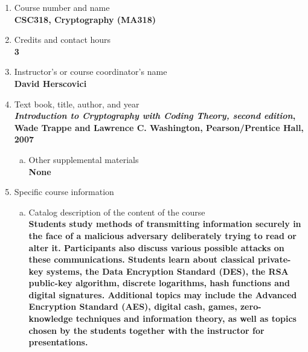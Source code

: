 \label{CSC318}  %
\begin{enumerate}[1.]
\item Course number and name\\
  {\bfseries
    CSC318, Cryptography (MA318)
  }
  
\item Credits and contact hours\\
  {\bfseries
    3  %
  }

\item Instructor's or course coordinator's name\\
  {\bfseries
    David Herscovici    
  }

\item Text book, title, author, and year\\
  {\bfseries
{\em Introduction to Cryptography with Coding Theory, second edition}, Wade Trappe and Lawrence C. Washington, Pearson/Prentice Hall, 2007    
  }
\begin{enumerate}[a.]
\item Other supplemental materials\\
  {\bfseries
    None    
  }
\end{enumerate}

\item Specific course information
\begin{enumerate}[a.]  
\item Catalog description of the content of the course\\
  {\bfseries
Students study methods of transmitting information securely in the face of a malicious adversary deliberately trying to read or alter it. Participants also discuss various possible attacks on these communications. Students learn about classical private-key systems, the Data Encryption Standard (DES), the RSA public-key algorithm, discrete logarithms, hash functions and digital signatures. Additional topics may include the Advanced Encryption Standard (AES), digital cash, games, zero-knowledge techniques and information theory, as well as topics chosen by the students together with the instructor for presentations.    
  }


\end{enumerate}
\end{enumerate}
